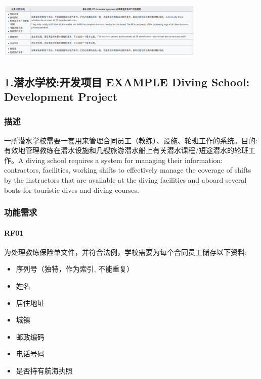 
\includegraphics[width=10cm]{Screenshotfrom20221219021522.png}

\hypertarget{ux6f5cux6c34ux5b66ux6821ux5f00ux53d1ux9879ux76ee-example-diving-school-development-project}{%
\subsection{1.潜水学校:开发项目 EXAMPLE Diving School: Development
Project}\label{ux6f5cux6c34ux5b66ux6821ux5f00ux53d1ux9879ux76ee-example-diving-school-development-project}}

\hypertarget{ux63cfux8ff0}{%
\subsubsection{描述}\label{ux63cfux8ff0}}

一所潜水学校需要一套用来管理合同员工（教练）、设施、轮班工作的系统。目的:有效地管理教练在潜水设施和几艘旅游潜水船上有关潜水课程/短途潜水的轮班工作。A
diving school requires a system for managing their information:
contractors, facilities, working shifts to effectively manage the
coverage of shifts by the instructors that are available at the diving
facilities and aboard several boats for touristic dives and diving
courses.

\hypertarget{ux529fux80fdux9700ux6c42}{%
\subsubsection{功能需求}\label{ux529fux80fdux9700ux6c42}}

\hypertarget{rf01}{%
\paragraph{RF01}\label{rf01}}

为处理教练保险单文件，并符合法例，学校需要为每个合同员工储存以下资料:

\begin{itemize}
\tightlist
\item
  序列号（独特，作为索引, 不能重复）
\item
  姓名
\item
  居住地址
\item
  城镇
\item
  邮政编码
\item
  电话号码
\item
  是否持有航海执照
\end{itemize}

